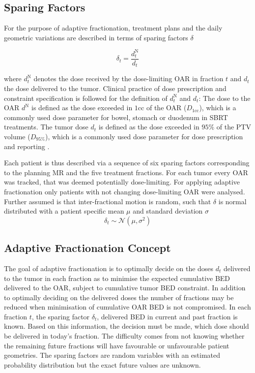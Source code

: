 \documentclass[\relativeRoot/ada.tex]{subfiles}
\begin{document}
\subsection{Sparing Factors}\label{sec:sparing_factors}
For the purpose of adaptive fractionation, treatment plans and the daily geometric variations are described in terms of sparing factors $\delta$

\begin{equation*}
    \delta_{t} = \frac{d_{t}^{\text{N}}}{d_{t}}
\end{equation*}

where $d_{t}^{\text{N}}$ denotes the dose received by the dose-limiting OAR in fraction $t$ and $d_{t}$ the dose delivered to the tumor. Clinical practice of dose prescription and constraint specification is followed for the definition of $d_{t}^{\text{N}}$ and $d_{t}$: The dose to the OAR $d^{\text{N}}$ is defined as the dose exceeded in $1$cc of the OAR ($D_{1\text{cc}}$), which is a commonly used dose parameter for bowel, stomach or duodenum in SBRT treatments. The tumor dose $d_{t}$ is defined as the dose exceeded in $95\%$ of the PTV volume ($D_{95\%}$), which is a commonly used dose parameter for dose prescription and reporting \cite{ICRU50}\cite{ICRU62}.

Each patient is thus described via a sequence of six sparing factors corresponding to the planning MR and the five treatment fractions. For each tumor every OAR was tracked, that was deemed potentially dose-limiting. For applying adaptive fractionation only patients with not changing dose-limiting OAR were analysed. Further assumed is that inter-fractional motion is random, such that $\delta$ is normal distributed with a patient specific mean $\mu$ and standard deviation $\sigma$
\begin{equation*}
\delta_t \sim \mathcal{N}(\mu,\sigma^2)
\end{equation*}

\subsection{Adaptive Fractionation Concept}

The goal of adaptive fractionation is to optimally decide on the doses $d_{t}$ delivered to the tumor in each fraction as to minimise the expected cumulative BED delivered to the OAR, subject to cumulative tumor BED constraint. In addition to optimally deciding on the delivered doses the number of fractions may be reduced when minimisation of cumulative OAR BED is not compromised. In each fraction $t$, the sparing factor $\delta_{t}$, delivered BED in current and past fraction is known. Based on this information, the decision must be made, which dose should be delivered in today's fraction. The difficulty comes from not knowing whether the remaining future fractions will have favourable  or unfavourable patient geometries. The sparing factors are random variables with an estimated probability distribution but the exact future values are unknown.
\end{document}
